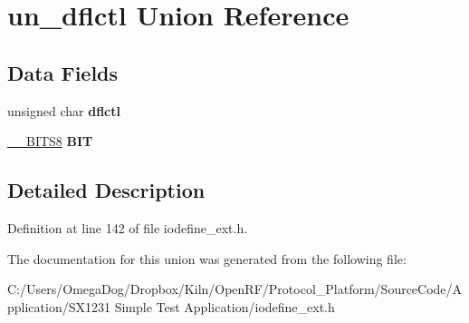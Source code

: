 \hypertarget{unionun__dflctl}{\section{un\-\_\-dflctl Union Reference}
\label{unionun__dflctl}
}
\subsection*{Data Fields}
\begin{DoxyCompactItemize}
\item 
\hypertarget{unionun__dflctl_ab053101f500b138326e56192d1841b83}{unsigned char {\bfseries dflctl}}\label{unionun__dflctl_ab053101f500b138326e56192d1841b83}

\item 
\hypertarget{unionun__dflctl_a8ed712feb171c1280be7573e1fdd8b9a}{\hyperlink{struct_____b_i_t_s8}{\-\_\-\-\_\-\-B\-I\-T\-S8} {\bfseries B\-I\-T}}\label{unionun__dflctl_a8ed712feb171c1280be7573e1fdd8b9a}

\end{DoxyCompactItemize}


\subsection{Detailed Description}


Definition at line 142 of file iodefine\-\_\-ext.\-h.



The documentation for this union was generated from the following file\-:\begin{DoxyCompactItemize}
\item 
C\-:/\-Users/\-Omega\-Dog/\-Dropbox/\-Kiln/\-Open\-R\-F/\-Protocol\-\_\-\-Platform/\-Source\-Code/\-Application/\-S\-X1231 Simple Test Application/iodefine\-\_\-ext.\-h\end{DoxyCompactItemize}
